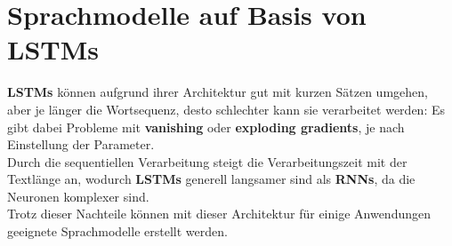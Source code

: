 \section{Sprachmodelle auf Basis von LSTMs}
\textbf{LSTMs} k\"onnen aufgrund ihrer Architektur gut mit kurzen S\"atzen umgehen, aber je l\"anger die Wortsequenz, desto schlechter kann sie verarbeitet werden: Es gibt dabei Probleme mit \textbf{vanishing} oder \textbf{exploding gradients}, je nach Einstellung der Parameter.\\
Durch die sequentiellen Verarbeitung steigt die Verarbeitungszeit mit der Textl\"ange an, wodurch \textbf{LSTMs} generell langsamer sind als \textbf{RNNs}, da die Neuronen komplexer sind.\\
Trotz dieser Nachteile k\"onnen mit dieser Architektur f\"ur einige Anwendungen geeignete Sprachmodelle erstellt werden.

